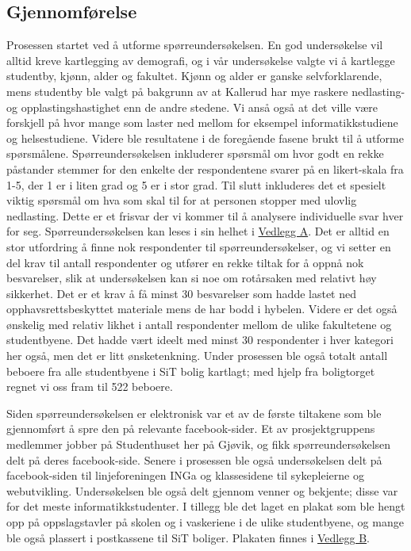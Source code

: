 \subsection{Gjennomførelse}
Prosessen startet ved å utforme spørreundersøkelsen. En god undersøkelse vil alltid kreve kartlegging av demografi, og i vår undersøkelse valgte vi å kartlegge studentby, kjønn, alder og fakultet. Kjønn og alder er ganske selvforklarende, mens studentby ble valgt på bakgrunn av at Kallerud har mye raskere nedlasting- og opplastingshastighet enn de andre stedene. Vi anså også at det ville være forskjell på hvor mange som laster ned mellom for eksempel informatikkstudiene og helsestudiene. Videre ble resultatene i de foregående fasene brukt til å utforme spørsmålene. Spørreundersøkelsen inkluderer spørsmål om hvor godt en rekke påstander stemmer for den enkelte der respondentene svarer på en likert-skala fra 1-5, der 1 er i liten grad og 5 er i stor grad. Til slutt inkluderes det et spesielt viktig spørsmål om hva som skal til for at personen stopper med ulovlig nedlasting. Dette er et frisvar der vi kommer til å analysere individuelle svar hver for seg. Spørreundersøkelsen kan leses i sin helhet i \hyperref[undersokelse]{Vedlegg A}.
\newline
Det er alltid en stor utfordring å finne nok respondenter til spørreundersøkelser, og vi setter en del krav til antall respondenter og utfører en rekke tiltak for å oppnå nok besvarelser, slik at undersøkelsen kan si noe om rotårsaken med relativt høy sikkerhet. Det er et krav å få minst 30 besvarelser som hadde lastet ned opphavsrettsbeskyttet materiale mens de har bodd i hybelen. Videre er det også ønskelig med relativ likhet i antall respondenter mellom de ulike fakultetene og studentbyene. Det hadde vært ideelt med minst 30 respondenter i hver kategori her også, men det er litt ønsketenkning. Under prosessen ble også totalt antall beboere fra alle studentbyene i SiT bolig kartlagt; med hjelp fra boligtorget regnet vi oss fram til 522 beboere.

Siden spørreundersøkelsen er elektronisk var et av de første tiltakene som ble gjennomført å spre den på relevante facebook-sider. Et av prosjektgruppens medlemmer jobber på Studenthuset her på Gjøvik, og fikk spørreundersøkelsen delt på deres facebook-side. Senere i prosessen ble også undersøkelsen delt på facebook-siden til linjeforeningen INGa og klassesidene til sykepleierne og webutvikling. Undersøkelsen ble også delt gjennom venner og bekjente; disse var for det meste informatikkstudenter. I tillegg ble det laget en plakat som ble hengt opp på oppslagstavler på skolen og i vaskeriene i de ulike studentbyene, og mange ble også plassert i postkassene til SiT boliger. Plakaten finnes i \hyperref[plakat]{Vedlegg B}. 

